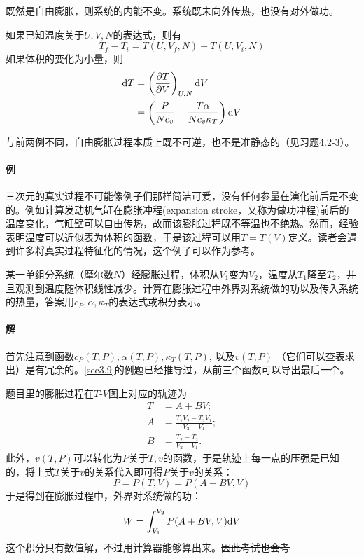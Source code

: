 既然是自由膨胀，则系统的内能不变。系统既未向外传热，也没有对外做功。

如果已知温度关于$U, V, N$的表达式，则有
\begin{equation}
	T_f - T_i = T(U, V_f, N) - T(U, V_i, N)
\label{equ7.49}
\end{equation}
如果体积的变化为小量，则
\begin{align}
	\mathrm{d} T &= \left( \frac{\partial T}{\partial V} \right)_{U, N} \mathrm{d} V \label{equ7.50} \\
	&= \left( \frac{P}{N c_v} - \frac{T\alpha}{N c_v \kappa_T} \right) \mathrm{d} V \label{equ7.51}
\end{align}

与前两例不同，自由膨胀过程本质上既不可逆，也不是准静态的（见习题4.2-3）。

\paragraph{例} 三次元的真实过程不可能像例子们那样简洁可爱，没有任何参量在演化前后是不变的。例如计算发动机气缸在膨胀冲程(expansion stroke，又称为做功冲程)前后的温度变化，气缸壁可以自由传热，故而该膨胀过程既不等温也不绝热。然而，经验表明温度可以近似表为体积的函数，于是该过程可以用$T = T(V)$定义。读者会遇到许多将真实过程特征化的情况，这个例子可以作为参考。

某一单组分系统（摩尔数$N$）经膨胀过程，体积从$V_1$变为$V_2$，温度从$T_1$降至$T_2$，并且观测到温度随体积线性减少。计算在膨胀过程中外界对系统做的功以及传入系统的热量，答案用$c_P, \alpha, \kappa_T$的表达式或积分表示。


\paragraph{解} 首先注意到函数$c_P (T, P), \alpha(T, P), \kappa_T (T, P)$, 以及$v(T, P)$ （它们可以查表求出）是有冗余的。\ref{sec3.9}的例题已经推导过，从前三个函数可以导出最后一个。

题目里的膨胀过程在$T\text{-}V$图上对应的轨迹为
\begin{align*}
	T &= A + BV; \\
	A &= \frac{T_1 V_2 - T_2 V_1}{V_2 - V_1}; \\
	B &= \frac{T_2 - T_2}{V_2 - V_1}.
\end{align*}
此外，$v(T, P)$可以转化为$P$关于$T, v$的函数，于是轨迹上每一点的压强是已知的，将上式$T$关于$v$的关系代入即可得$P$关于$v$的关系： 
\[
	P = P(T, V) = P(A + BV, V)
\]
于是得到在膨胀过程中，外界对系统做的功：
\[
	W = \int_{V_1}^{V_2} P(A + BV, V) \mathrm{d} V 
\]
这个积分只有数值解，不过用计算器能够算出来。\sout{因此考试也会考} 

